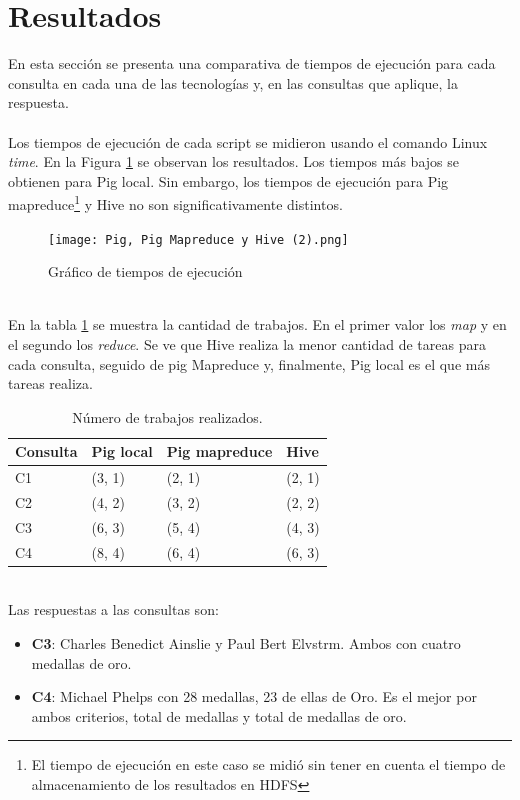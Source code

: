 \section*{Resultados}
En esta sección se presenta una comparativa de tiempos de ejecución para cada consulta en cada una de las tecnologías y, en las consultas que aplique, la respuesta.\\\\
Los tiempos de ejecución de cada script se midieron usando el comando Linux \textit{time}. En la Figura \ref{fig:tiempos} se observan los resultados. Los tiempos más bajos se obtienen para Pig local. Sin embargo, los tiempos de ejecución para Pig mapreduce\footnote{El tiempo de ejecución en este caso se midió sin tener en cuenta el tiempo de almacenamiento de los resultados en HDFS} y Hive no son significativamente distintos.
\begin{figure}[hp!]
	\centering
	\texttt{[image: Pig, Pig Mapreduce y Hive (2).png]}
	\caption{Gráfico de tiempos de ejecución}
	\label{fig:tiempos}
\end{figure}
\\
En la tabla \ref{tbl:trabajos_mapreduce} se muestra la cantidad de trabajos. En el primer valor los \textit{map} y en el segundo los \textit{reduce}. Se ve que Hive realiza la menor cantidad de tareas para cada consulta, seguido de pig Mapreduce y, finalmente, Pig local es el que más tareas realiza.
\setlength{\tabcolsep}{10pt} %
\renewcommand{\arraystretch}{1.5} %
\begin{table}[hp]
	\centering
	\caption{Número de trabajos realizados.\label{tbl:trabajos_mapreduce}}
	\begin{tabular}{llll}
		{Consulta} & Pig local & Pig mapreduce & Hive \\ \hline
		C1                                                      & (3, 1)    & (2, 1)             & (2, 1)    \\
		C2                                                      & (4, 2)    & (3, 2)             & (2, 2)    \\ 
		C3                                & (6, 3)    & (5, 4)             & (4, 3)    \\
		C4                                                      & (8, 4)    & (6, 4)             & (6, 3)       
	\end{tabular}
\end{table}\\
Las respuestas a las consultas son:
\begin{itemize}
	\item \textbf{C3}: Charles Benedict Ainslie y
	Paul Bert Elvstrm. Ambos con cuatro medallas de oro.
	\item \textbf{C4}: Michael Phelps con 28 medallas, 23 de ellas de Oro. Es el mejor por ambos criterios, total de medallas y total de medallas de oro.
\end{itemize}
